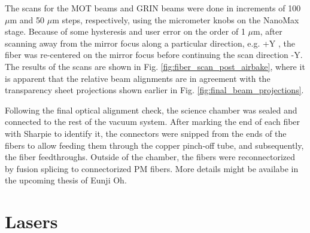The scans for the MOT beams and GRIN beams were done in increments of 100 $\mu$m and 50 $\mu$m steps, respectively, using the micrometer knobs on the NanoMax stage. Because of some hysteresis and user error on the order of 1 $\mu$m, after scanning away from the mirror focus along a particular direction, e.g. +Y , the fiber was re-centered on the mirror focus before continuing the scan direction -Y. The results of the scans are shown in Fig. \ref{fig:fiber_scan_post_airbake}, where it is apparent that the relative beam alignments are in agreement with the transparency sheet projections shown earlier in Fig. \ref{fig:final_beam_projections}. 


Following the final optical alignment check, the science chamber was sealed and connected to the rest of the vacuum system. After marking the end of each fiber with Sharpie to identify it, the connectors were snipped from the ends of the fibers to allow feeding them through the copper pinch-off tube, and subsequently, the fiber feedthroughs. Outside of the chamber, the fibers were reconnectorized by fusion splicing to connectorized PM fibers. More details might be availabe in the upcoming thesis of Eunji Oh.

\section{Lasers}

